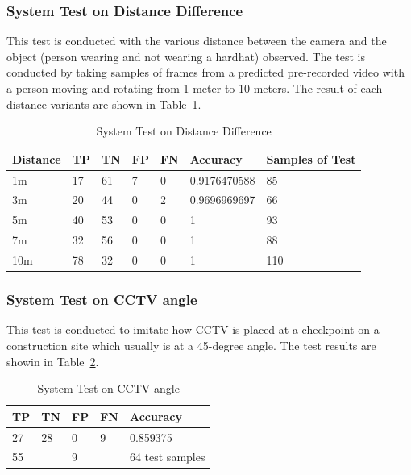 \subsubsection{System Test on Distance Difference}
\label{subsubsec:hedect_test_dist}

\par This test is conducted with the various distance between the camera and the object (person wearing and not wearing a hardhat) observed. The test is conducted by taking samples of frames from a predicted pre-recorded video with a person moving and rotating from 1 meter to 10 meters. The result of each distance variants are shown in Table~\ref{tb:systest_dist_test}.

\begin{table}
  \centering
  \caption{System Test on Distance Difference}
  \label{tb:systest_dist_test}
  \begin{tabular}{|l|l|l|l|l|l|l|} 
  \hline
  Distance & TP & TN & FP & FN & Accuracy     & Samples of Test  \\ 
  \hline
  1m       & 17 & 61 & 7  & 0  & 0.9176470588 & 85               \\ 
  \hline
  3m       & 20 & 44 & 0  & 2  & 0.9696969697 & 66               \\ 
  \hline
  5m       & 40 & 53 & 0  & 0  & 1            & 93               \\ 
  \hline
  7m       & 32 & 56 & 0  & 0  & 1            & 88               \\ 
  \hline
  10m      & 78 & 32 & 0  & 0  & 1            & 110              \\
  \hline
  \end{tabular}
\end{table}


\subsubsection{System Test on CCTV angle}
\label{subsubsec:hedect_test_cctv}

\par This test is conducted to imitate how CCTV is placed at a checkpoint on a construction site which usually is at a 45-degree angle. The test results are showin in Table~\ref{tb:systest_cctv}.

\begin{table}
  \centering
  \caption{System Test on CCTV angle}
  \label{tb:systest_cctv}
  \begin{tabular}{|l|l|l|l|l|} 
  \hline
  TP & TN & FP & FN & Accuracy         \\ 
  \hline
  27 & 28 & 0  & 9  & 0.859375         \\ 
  \hline
  \multicolumn{2}{|l|}{55}   & \multicolumn{2}{l|}{9} & 64 test samples  \\
  \hline
  \end{tabular}
\end{table}


